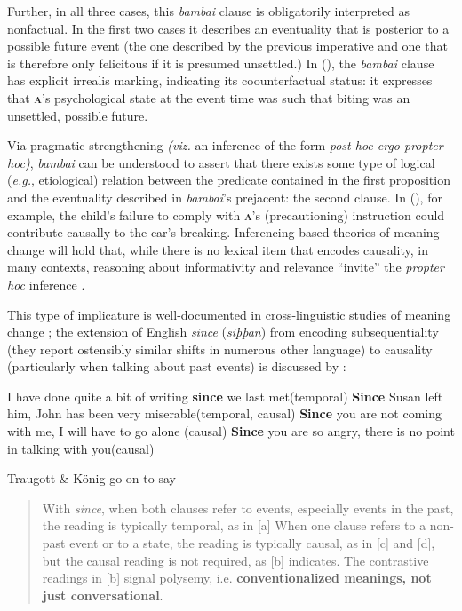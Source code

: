Further, in all three cases, this \textit{bambai} clause is obligatorily interpreted as nonfactual. In the first two cases it describes an eventuality that is posterior to a possible future event (the one described by the previous imperative and one that is therefore only felicitous if it is presumed unsettled.) In (), the \textit{bambai} clause has explicit irrealis marking, indicating its coounterfactual status: it expresses that \textbf{\textsc{a}}'s psychological state at the event time was such that biting was an unsettled, possible future.

Via pragmatic strengthening \textit{(viz.} an inference of the form \textit{post hoc ergo propter hoc)}, \textit{bambai} can be understood to assert that there exists some type of logical (\textit{e.g.}, etiological) relation between the predicate contained in the first proposition and the  eventuality described in \textit{bambai}'s prejacent: the second clause. In (), for example, the child's failure to comply with \textsc{\textbf{a}}'s (precautioning) instruction could contribute causally to the car's breaking. Inferencing-based theories of meaning change will hold that, while there is no lexical item that encodes causality, in many contexts, reasoning about informativity and relevance ``invite'' the \textit{propter hoc} inference \citep[\textit{e.g.},][564]{Geis1971}.

This type of implicature is well-documented in cross-linguistic studies of meaning change \citep[see also][403]{Kuteva2019}; the extension of English \textit{since} (\textit{siþþan}) from encoding subsequentiality (they report ostensibly similar shifts in numerous other language) to causality (particularly when talking about past events) is discussed by \citet{Traugott1991}:

\pex\a I have done quite a bit of writing \textbf{since} we last met\hfill (temporal) \a \textbf{Since} Susan left him, John has been very miserable\hfill (temporal, causal) \a \textbf{Since} you are not coming with me, I will have to go alone \hfill(causal)
\a \textbf{Since} you are so angry, there is no point in talking with you\hfill(causal)
\xe

\noindent Traugott \& König go on to say

\begin{quote}
	{\small With \textit{since}, when both clauses refer to events, especially events in the past, the reading is typically temporal, as in [a] When one clause refers to a non- past event or to a state, the reading is typically causal, as in [c] and [d], but the causal reading is not required, as [b] indicates. The contrastive readings in [b] signal polysemy, i.e. \textbf{conventionalized meanings, not just conversational}.}
\end{quote}

